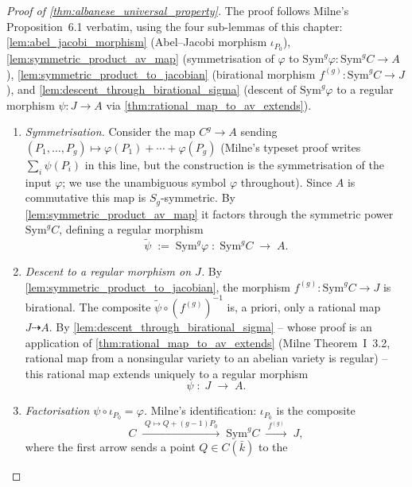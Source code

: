 \begin{proof}[Proof of \cref{thm:albanese_universal_property}]
  
  The proof follows Milne's Proposition~6.1 verbatim, using the four
  sub-lemmas of this chapter:
  \cref{lem:abel_jacobi_morphism} (Abel--Jacobi morphism \(\iota_{P_0}\)),
  \cref{lem:symmetric_product_av_map} (symmetrisation of \(\varphi\) to
  \(\mathrm{Sym}^g \varphi \colon \mathrm{Sym}^g C \to A\)),
  \cref{lem:symmetric_product_to_jacobian} (birational morphism
  \(f^{(g)} \colon \mathrm{Sym}^g C \to J\)), and
  \cref{lem:descent_through_birational_sigma} (descent of \(\mathrm{Sym}^g
  \varphi\) to a regular morphism \(\psi \colon J \to A\) via
  \cref{thm:rational_map_to_av_extends}).
  \begin{enumerate}
    \item \emph{Symmetrisation.} Consider the map \(C^g \to A\) sending
      \((P_1, \ldots, P_g) \mapsto \varphi(P_1) + \cdots + \varphi(P_g)\)
      (Milne's typeset proof writes \(\sum_i \psi(P_i)\) in this line, but
      the construction is the symmetrisation of the input \(\varphi\); we
      use the unambiguous symbol \(\varphi\) throughout). Since \(A\) is
      commutative this map is \(S_g\)-symmetric. By
      \cref{lem:symmetric_product_av_map} it factors through the
      symmetric power \(\mathrm{Sym}^g C\), defining a regular morphism
      \[
        \widetilde \psi \;:=\; \mathrm{Sym}^g \varphi
        \;\colon\; \mathrm{Sym}^g C \;\longrightarrow\; A.
      \]
    \item \emph{Descent to a regular morphism on \(J\).} By
      \cref{lem:symmetric_product_to_jacobian}, the morphism
      \(f^{(g)} \colon \mathrm{Sym}^g C \to J\) is birational. The
      composite \(\widetilde \psi \circ (f^{(g)})^{-1}\) is, a priori,
      only a rational map \(J \dashrightarrow A\). By
      \cref{lem:descent_through_birational_sigma} -- whose proof is an
      application of \cref{thm:rational_map_to_av_extends} (Milne
      Theorem~I~3.2, rational map from a nonsingular variety to an
      abelian variety is regular) -- this rational map extends uniquely
      to a regular morphism
      \[
        \psi \;\colon\; J \;\longrightarrow\; A.
      \]
    \item \emph{Factorisation \(\psi \circ \iota_{P_0} = \varphi\).}
      Milne's identification: \(\iota_{P_0}\) is the composite
      \[
        C \;\xrightarrow{\;Q \mapsto Q + (g-1) P_0\;}\;
        \mathrm{Sym}^g C \;\xrightarrow{\;f^{(g)}\;}\; J,
      \]
      where the first arrow sends a point \(Q \in C(\bar k)\) to the

\end{enumerate}
\end{proof}
